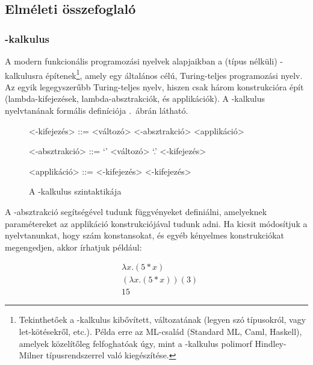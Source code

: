 \documentclass[a4paper,oneside]{article}
\begin{document}
\subsection{Elméleti összefoglaló}

\subsubsection{\texorpdfstring{\lam}{lambda}-kalkulus}
A modern funkcionális programozási nyelvek alapjaikban a (típus nélküli) \lam-kalkulusra építenek\footnote{Tekinthetőek a \lam-kalkulus kibővített, változatának (legyen szó típusokról, vagy \textsf{let}-kötésekről, etc.). Példa erre az ML-család (Standard ML, Caml, Haskell), amelyek közelítőleg felfoghatóak úgy, mint a \lam-kalkulus polimorf Hindley-Milner típusrendszerrel való kiegészítése.}, amely egy általános célú, Turing-teljes programozási nyelv. Az egyik legegyszerűbb Turing-teljes nyelv, hiszen csak három konstrukcióra épít (lambda-kifejezések, lambda-absztrakciók, és applikációk). A \lam-kalkulus nyelvtanának formális definíciója .~ábrán látható.

\begin{figure}[htbp]
  \centering
  \begin{minipage}{7.5cm}
    \setlength{\grammarindent}{9em}

    \begin{grammar}
      <\lam-kifejezés> ::= <változó>
      \alt <\lam-absztrakció>
      \alt <applikáció>

      <\lam-absztrakció> ::= `\lam' <változó> `.' <\lam-kifejezés>

      <applikáció> ::= <\lam-kifejezés> <\lam-kifejezés>
    \end{grammar}
  \end{minipage}
  \caption{A \lam-kalkulus szintaktikája}
  \label{fig:lambda-grammar}
\end{figure}

A \lam-absztrakció segítségével tudunk függvényeket definiálni, amelyeknek paramétereket az applikáció konstrukciójával tudunk adni. Ha kicsit módosítjuk a nyelvtanunkat, hogy szám konstansokat, és egyéb kényelmes konstrukciókat megengedjen, akkor írhatjuk például:

\[
  \begin{aligned}
     & \lambda x.(5*x)      \\
     & (\lambda x.(5*x))(3) \\
     & 15
  \end{aligned}
\]
\end{document}
